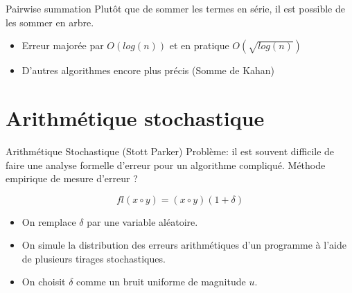 \documentclass{beamer}
\begin{document}
\begin{frame}{Pairwise summation}
    Plutôt que de sommer les termes en série, il est possible de les sommer en arbre.

    \begin{itemize}
        \item Erreur majorée par $O(log(n))$ et en pratique $O(\sqrt{log(n)})$
        \item D'autres algorithmes encore plus précis (Somme de Kahan)
    \end{itemize}
\end{frame}

\section{Arithmétique stochastique}

\begin{frame}{Arithmétique Stochastique (Stott Parker)}
    Problème: il est souvent difficile de faire une analyse formelle d'erreur pour un algorithme compliqué. Méthode empirique de mesure d'erreur ?

    \[ fl(x \circ y ) = (x \circ y)(1+\delta) \]

    \begin{itemize}
        \item On remplace $\delta$ par une variable aléatoire.

        \item On simule la distribution des erreurs arithmétiques d'un programme à
              l'aide de plusieurs tirages stochastiques.

        \item On choisit $\delta$ comme un bruit uniforme de magnitude $u$.
    \end{itemize}
\end{frame}
\end{document}
